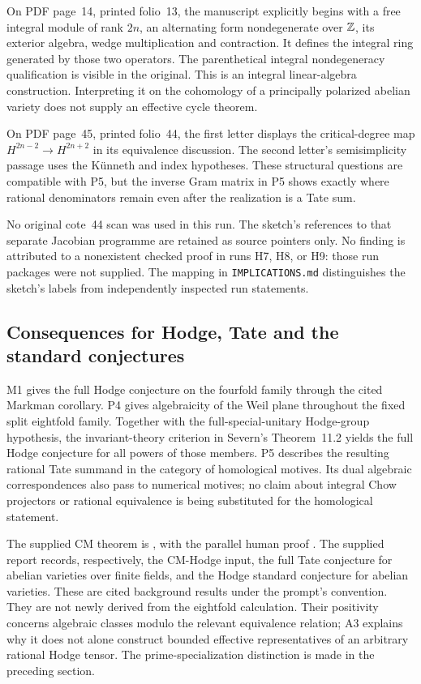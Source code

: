 \documentclass[11pt,a4paper]{article}
\theoremstyle{definition}\newtheorem{definition}[theorem]{Definition}
\theoremstyle{remark}\newtheorem{remark}[theorem]{Remark}
\begin{document}
On PDF page~14, printed folio~13, the manuscript explicitly begins with a free integral module of rank $2n$, an alternating form nondegenerate over $\mathbb Z$, its exterior algebra, wedge multiplication and contraction. It defines the integral ring generated by those two operators. The parenthetical integral nondegeneracy qualification is visible in the original. This is an integral linear-algebra construction. Interpreting it on the cohomology of a principally polarized abelian variety does not supply an effective cycle theorem.

On PDF page~45, printed folio~44, the first letter displays the critical-degree map $H^{2n-2}\to H^{2n+2}$ in its equivalence discussion. The second letter's semisimplicity passage uses the K\"unneth and index hypotheses. These structural questions are compatible with P5, but the inverse Gram matrix in P5 shows exactly where rational denominators remain even after the realization is a Tate sum.

No original cote~44 scan was used in this run. The sketch's references to that separate Jacobian programme are retained as source pointers only. No finding is attributed to a nonexistent checked proof in runs H7, H8, or H9: those run packages were not supplied. The mapping in \texttt{IMPLICATIONS.md} distinguishes the sketch's labels from independently inspected run statements.

\subsection*{Consequences for Hodge, Tate and the standard conjectures}
M1 gives the full Hodge conjecture on the fourfold family through the cited Markman corollary. P4 gives algebraicity of the Weil plane throughout the fixed split eightfold family. Together with the full-special-unitary Hodge-group hypothesis, the invariant-theory criterion in Severn's Theorem~11.2 yields the full Hodge conjecture for all powers of those members. P5 describes the resulting rational Tate summand in the category of homological motives. Its dual algebraic correspondences also pass to numerical motives; no claim about integral Chow projectors or rational equivalence is being substituted for the homological statement.

The supplied CM theorem is \citet[Theorem~1.1]{OpenAI26}, with the parallel human proof \citet[Theorem~I]{vanHoften26}. The supplied report \citet[Theorems~2.1, 3.1, and~3.5]{Milne26} records, respectively, the CM-Hodge input, the full Tate conjecture for abelian varieties over finite fields, and the Hodge standard conjecture for abelian varieties. These are cited background results under the prompt's convention. They are not newly derived from the eightfold calculation. Their positivity concerns algebraic classes modulo the relevant equivalence relation; A3 explains why it does not alone construct bounded effective representatives of an arbitrary rational Hodge tensor. The prime-specialization distinction is made in the preceding section.
\end{document}

